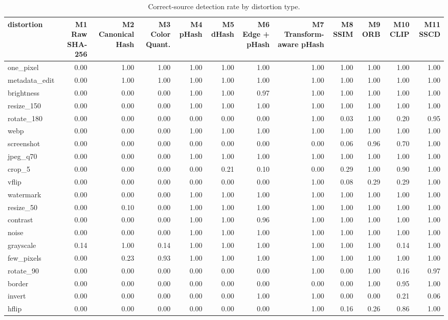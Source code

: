 \begin{table}[htbp]
\caption{Correct-source detection rate by distortion type.}
\label{tab:distortion}
\centering
\begin{tabular}{lrrrrrrrrrrr}
\toprule
distortion & M1 Raw SHA-256 & M2 Canonical Hash & M3 Color Quant. & M4 pHash & M5 dHash & M6 Edge + pHash & M7 Transform-aware pHash & M8 SSIM & M9 ORB & M10 CLIP & M11 SSCD \\
\midrule
one\_pixel & 0.00 & 1.00 & 1.00 & 1.00 & 1.00 & 1.00 & 1.00 & 1.00 & 1.00 & 1.00 & 1.00 \\
metadata\_edit & 0.00 & 1.00 & 1.00 & 1.00 & 1.00 & 1.00 & 1.00 & 1.00 & 1.00 & 1.00 & 1.00 \\
brightness & 0.00 & 0.00 & 0.00 & 1.00 & 1.00 & 0.97 & 1.00 & 1.00 & 1.00 & 1.00 & 1.00 \\
resize\_150 & 0.00 & 0.00 & 0.00 & 1.00 & 1.00 & 1.00 & 1.00 & 1.00 & 1.00 & 1.00 & 1.00 \\
rotate\_180 & 0.00 & 0.00 & 0.00 & 0.00 & 0.00 & 0.00 & 1.00 & 0.03 & 1.00 & 0.20 & 0.95 \\
webp & 0.00 & 0.00 & 0.00 & 1.00 & 1.00 & 1.00 & 1.00 & 1.00 & 1.00 & 1.00 & 1.00 \\
screenshot & 0.00 & 0.00 & 0.00 & 0.00 & 0.00 & 0.00 & 0.00 & 0.06 & 0.96 & 0.70 & 1.00 \\
jpeg\_q70 & 0.00 & 0.00 & 0.00 & 1.00 & 1.00 & 1.00 & 1.00 & 1.00 & 1.00 & 1.00 & 1.00 \\
crop\_5 & 0.00 & 0.00 & 0.00 & 0.00 & 0.21 & 0.10 & 0.00 & 0.29 & 1.00 & 0.90 & 1.00 \\
vflip & 0.00 & 0.00 & 0.00 & 0.00 & 0.00 & 0.00 & 1.00 & 0.08 & 0.29 & 0.29 & 1.00 \\
watermark & 0.00 & 0.00 & 0.00 & 1.00 & 1.00 & 1.00 & 1.00 & 1.00 & 1.00 & 1.00 & 1.00 \\
resize\_50 & 0.00 & 0.10 & 0.00 & 1.00 & 1.00 & 1.00 & 1.00 & 1.00 & 1.00 & 1.00 & 1.00 \\
contrast & 0.00 & 0.00 & 0.00 & 1.00 & 1.00 & 0.96 & 1.00 & 1.00 & 1.00 & 1.00 & 1.00 \\
noise & 0.00 & 0.00 & 0.00 & 1.00 & 1.00 & 1.00 & 1.00 & 1.00 & 1.00 & 1.00 & 1.00 \\
grayscale & 0.14 & 1.00 & 0.14 & 1.00 & 1.00 & 1.00 & 1.00 & 1.00 & 1.00 & 0.14 & 1.00 \\
few\_pixels & 0.00 & 0.23 & 0.93 & 1.00 & 1.00 & 1.00 & 1.00 & 1.00 & 1.00 & 1.00 & 1.00 \\
rotate\_90 & 0.00 & 0.00 & 0.00 & 0.00 & 0.00 & 0.00 & 1.00 & 0.00 & 1.00 & 0.16 & 0.97 \\
border & 0.00 & 0.00 & 0.00 & 0.00 & 0.00 & 0.00 & 0.00 & 0.00 & 1.00 & 0.95 & 1.00 \\
invert & 0.00 & 0.00 & 0.00 & 0.00 & 0.00 & 1.00 & 1.00 & 0.00 & 0.00 & 0.21 & 0.06 \\
hflip & 0.00 & 0.00 & 0.00 & 0.00 & 0.00 & 0.00 & 1.00 & 0.16 & 0.26 & 0.86 & 1.00 \\
\bottomrule
\end{tabular}
\end{table}
